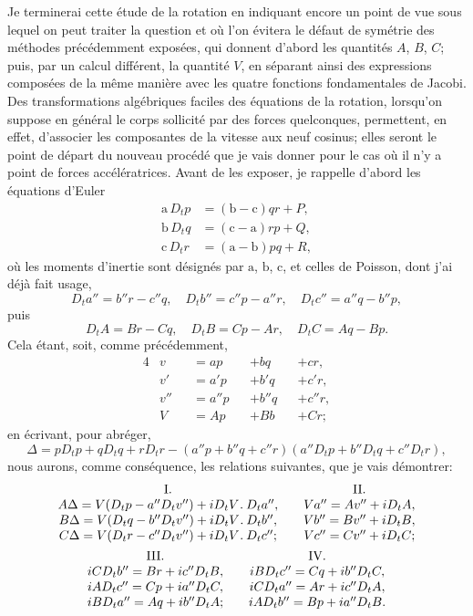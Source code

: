 \documentclass[11pt,leqno,oneside,letterpaper]{book}[2005/09/16]
\newcommand{\cntrdot}{\mathbin{.}}
\begin{document}
Je terminerai cette \'etude de la rotation en indiquant encore un
point de vue sous lequel on peut traiter la question et o\`u l'on \'evitera
le d\'efaut de sym\'etrie des m\'ethodes pr\'ec\'edemment expos\'ees, qui donnent
d'abord les quantit\'es $A$, $B$, $C$; puis, par un calcul diff\'erent, la quantit\'e $V$,
en s\'eparant ainsi des expressions compos\'ees de la m\^eme mani\`ere avec les
quatre fonctions fondamentales de Jacobi. Des transformations alg\'ebriques
faciles des \'equations de la rotation, lorsqu'on suppose en g\'en\'eral le corps
sollicit\'e par des forces quelconques, permettent, en effet, d'associer les
composantes de la vitesse aux neuf cosinus; elles seront le point de d\'epart
du nouveau proc\'ed\'e que je vais donner pour le cas o\`u il n'y a point de
forces acc\'el\'eratrices. Avant de les exposer, je rappelle d'abord les \'equations
d'Euler
\begin{align*}
  \mathrm{a}\,D_tp &= (\mathrm{b-c})qr + P,  \\
  \mathrm{b}\,D_tq &= (\mathrm{c-a})rp + Q,  \\
  \mathrm{c}\,D_tr &= (\mathrm{a-b})pq + R,
\end{align*}
o\`u les moments d'inertie sont d\'esign\'es par $\mathrm{a}$, $\mathrm{b}$, $\mathrm{c}$, et celles de Poisson,
dont j'ai d\'ej\`a fait usage,
\[
  D_ta'' = b''r - c''q,  \quad
  D_tb'' = c''p - a''r,  \quad
  D_tc'' = a''q - b''p,
\]
puis
\[
  D_tA = Br - Cq,  \quad
  D_tB = Cp - Ar,  \quad
  D_tC = Aq - Bp.
\]
Cela \'etant, soit, comme pr\'ec\'edemment,
\begin{alignat*}{4}
& v  &&= ap  &&+ bq   &&+ cr,\\
& v' &&= a'p &&+ b'q  &&+ c'r,\\
& v''&&= a''p&&+ b''q &&+ c''r,\\
& V  &&= Ap  &&+ Bb &&+ Cr;
\end{alignat*}
en \'ecrivant, pour abr\'eger,
\[
  \Delta = pD_tp + qD_tq + rD_tr
- (a''p + b''q + c''r) (a''D_tp + b''D_tq + c''D_tr),
\]
nous aurons, comme cons\'equence, les relations suivantes, que je vais d\'e\-mont\-rer:
\begin{gather*}
\begin{array}{c@{\qquad}c}
\text{I.} & \text{II.} \\
  A\Delta = V(D_tp - a''D_tv'') + iD_tV \cntrdot D_ta'', &
  Va'' = Av'' + iD_tA,
\\
  B\Delta = V(D_tq - b''D_tv'') + iD_tV \cntrdot D_tb'', &
  Vb'' = Bv'' + iD_tB,
\\
  C\Delta = V(D_tr - c''D_tv'') + iD_tV \cntrdot D_tc''; &
  Vc'' = Cv'' + iD_tC;
\end{array}
\\
\begin{array}{c@{\qquad}c}
  \text{III.} & \text{IV.} \\
  iCD_t b'' = Br + ic'' D_t B,  &
  iBD_t c'' = Cq + ib'' D_t C,\\
  iAD_t c'' = Cp + ia'' D_t C,  &
  iCD_t a'' = Ar + ic'' D_t A,\\
  iBD_t a'' = Aq + ib'' D_t A;  &
  iAD_t b'' = Bp + ia'' D_t B.
\end{array}
\end{gather*}
\end{document}
